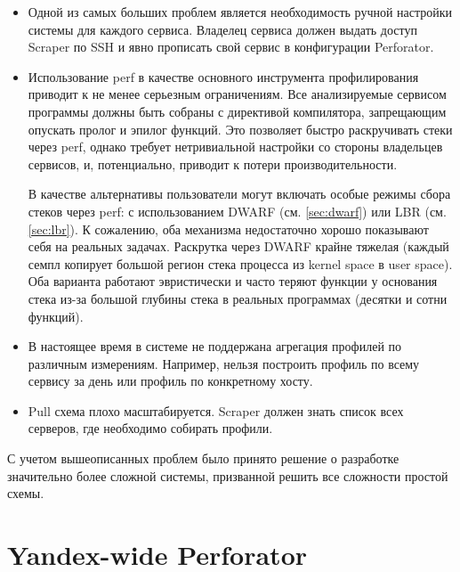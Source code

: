 \begin{itemize}
    \item
        Одной из самых больших проблем является необходимость ручной настройки системы для каждого сервиса.
        Владелец сервиса должен выдать доступ Scraper по SSH и явно прописать свой сервис в конфигурации Perforator.

    \item
        Использование perf в качестве основного инструмента профилирования приводит к не менее серьезным ограничениям.
        Все анализируемые сервисом программы должны быть собраны с директивой компилятора, запрещающим опускать пролог и эпилог функций.
        Это позволяет быстро раскручивать стеки через perf, однако требует нетривиальной настройки со стороны владельцев сервисов, и,
        потенциально, приводит к потери производительности.

        В качестве альтернативы пользователи могут включать особые режимы сбора стеков через perf: с использованием
        DWARF (см. \ref{sec:dwarf}) или LBR (см. \ref{sec:lbr}).
        К сожалению, оба механизма недостаточно хорошо показывают себя на реальных задачах.
        Раскрутка через DWARF крайне тяжелая (каждый семпл копирует большой регион стека процесса из kernel space в user space).
        Оба варианта работают эвристически и часто теряют функции у основания стека из-за большой глубины стека в реальных программах
        (десятки и сотни функций).

    \item
        В настоящее время в системе не поддержана агрегация профилей по различным измерениям.
        Например, нельзя построить профиль по всему сервису за день или профиль по конкретному хосту.

    \item
        Pull схема плохо масштабируется. Scraper должен знать список всех серверов, где необходимо собирать профили.
\end{itemize}

С учетом вышеописанных проблем было принято решение о разработке значительно более сложной системы, призванной решить
все сложности простой схемы.

\section{Yandex-wide Perforator}
